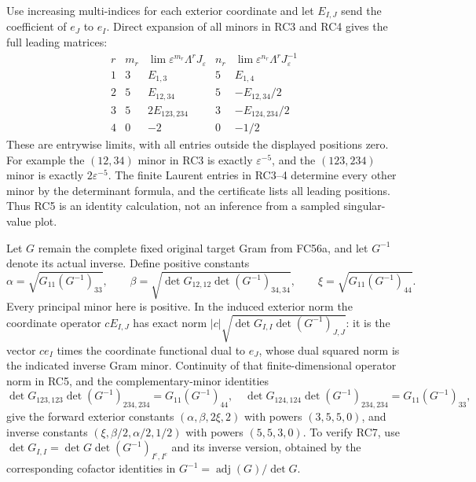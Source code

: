 \documentclass[11pt]{article}
\begin{document}
Use increasing multi-indices for each exterior coordinate and let
$E_{I,J}$ send the coefficient of $e_J$ to $e_I$. Direct expansion
of all minors in RC3 and RC4 gives the full leading matrices:
\[
 \begin{array}{c|c|c|c|c}
 r& m_r&\lim\varepsilon^{m_r}\Lambda^rJ_\varepsilon&
        n_r&\lim\varepsilon^{n_r}\Lambda^rJ_\varepsilon^{-1}\\\hline
 1&3&E_{1,3}&5&E_{1,4}\\
 2&5&E_{12,34}&5&-E_{12,34}/2\\
 3&5&2E_{123,234}&3&-E_{124,234}/2\\
 4&0&-2&0&-1/2
 \end{array} \tag{RC5}
\]
These are entrywise limits, with all entries outside the displayed
positions zero. For example the $(12,34)$ minor in RC3 is exactly
$\varepsilon^{-5}$, and the $(123,234)$ minor is exactly
$2\varepsilon^{-5}$. The finite Laurent entries in RC3--4 determine
every other minor by the determinant formula, and the certificate
lists all leading positions. Thus RC5 is an identity calculation,
not an inference from a sampled singular-value plot.

Let $G$ remain the complete fixed original target Gram from FC56a,
and let $G^{-1}$ denote its actual inverse. Define positive constants
\[
 \alpha=\sqrt{G_{11}(G^{-1})_{33}},\qquad
 \beta=\sqrt{\det G_{12,12}\det(G^{-1})_{34,34}},\qquad
 \xi=\sqrt{G_{11}(G^{-1})_{44}}. \tag{RC6}
\]
Every principal minor here is positive. In the induced exterior
norm the coordinate operator $cE_{I,J}$ has exact norm
$|c|\sqrt{\det G_{I,I}\det(G^{-1})_{J,J}}$: it is the vector
$ce_I$ times the coordinate functional dual to $e_J$, whose
dual squared norm is the indicated inverse Gram minor.
Continuity of that finite-dimensional operator norm in RC5, and
the complementary-minor identities
\[
 \det G_{123,123}\det(G^{-1})_{234,234}
       =G_{11}(G^{-1})_{44},\quad
 \det G_{124,124}\det(G^{-1})_{234,234}
       =G_{11}(G^{-1})_{33}, \tag{RC7}
\]
give the forward exterior constants $(\alpha,\beta,2\xi,2)$
with powers $(3,5,5,0)$, and inverse constants
$(\xi,\beta/2,\alpha/2,1/2)$ with powers $(5,5,3,0)$.
To verify RC7, use
$\det G_{I,I}=\det G\det(G^{-1})_{I^c,I^c}$ and its inverse
version, obtained by the corresponding cofactor identities in
$G^{-1}=\operatorname{adj}(G)/\det G$.
\end{document}
